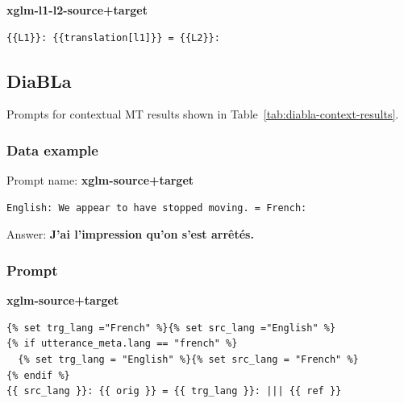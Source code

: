 \documentclass[twoside,11pt]{article}
\begin{document}

\noindent\textbf{xglm-l1-l2-source+target}
\begin{verbatim}
{{L1}}: {{translation[l1]}} = {{L2}}:
\end{verbatim}

\subsection{DiaBLa}

Prompts for contextual MT results shown in Table~\ref{tab:diabla-context-results}.

\subsubsection{Data example}

Prompt name: \textbf{xglm-source+target}
\begin{verbatim}
English: We appear to have stopped moving. = French:
\end{verbatim}
Answer: \textbf{J'ai l'impression qu'on s'est arrêtés.}

\subsubsection{Prompt}

\textbf{xglm-source+target}
\begin{verbatim}
{% set trg_lang ="French" %}{% set src_lang ="English" %}
{% if utterance_meta.lang == "french" %}
  {% set trg_lang = "English" %}{% set src_lang = "French" %}
{% endif %}
{{ src_lang }}: {{ orig }} = {{ trg_lang }}: ||| {{ ref }}
\end{verbatim}
\end{document}
